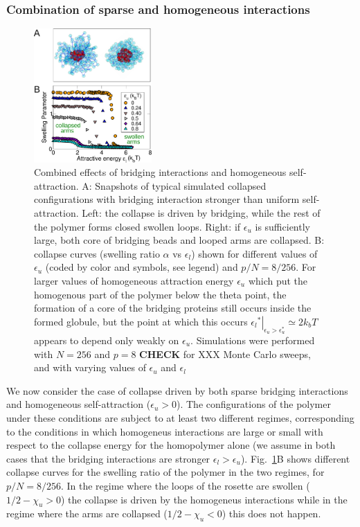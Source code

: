 \documentclass[
preprint,
a4paper,
12pt,
superscriptaddress,
pre]{revtex4}
\begin{document}
\subsubsection*{Combination of sparse and homogeneous interactions} 

\begin{figure}
  \centering
  \includegraphics[width=0.4\textwidth]{fig4}
  \caption{Combined effects of bridging interactions and
      homogeneous self-attraction.  A: Snapshots of  typical simulated
      collapsed configurations with bridging interaction stronger than
      uniform self-attraction. Left: the collapse is driven
      by bridging,  while the rest of the polymer forms closed swollen
      loops. Right: if $\epsilon_u$ is sufficiently large, both core
      of bridging beads and looped arms are collapsed. 
    B: collapse curves (swelling ratio $\alpha$ vs $\epsilon_l$) shown for
    different values of $\epsilon_u$ (coded by color and symbols, see
    legend) and $p/N = 8/256$.
%
    For larger values of homogeneous attraction energy $\epsilon_u$
    which put the homogenous part of the polymer below the theta
    point, the formation of a core  of the bridging proteins still occurs inside
    the formed globule, but the point at which this  occurs
    $\left.{\epsilon_l}^*\right|_{\epsilon_u > \epsilon_u^*} \simeq 2k_bT$
    appears to depend only weakly on $\epsilon_u$.
%
    Simulations were  performed with $N=256$ and $p=8$
    \textbf{CHECK} for XXX Monte Carlo sweeps, and with varying values
    of $\epsilon_u$ and $\epsilon_l$ }
  \label{fig:4}
\end{figure}

We now consider the case of collapse driven by both sparse bridging
interactions and homogeneous self-attraction ($\epsilon_u > 0$).  The
configurations of the polymer under these conditions are subject to at
least two different regimes, corresponding to the conditions in which
homogeneus interactions are large or small with respect to the
collapse energy for the homopolymer alone (we assume in both cases
that the bridging interactions are stronger $\epsilon_l >
\epsilon_u$).
Fig.~\ref{fig:4}B shows different collapse curves for the swelling
ratio of the polymer in the two regimes, for $p/N = 8/256$. In the
regime where the loops of the rosette are swollen ($1/2 - \chi_u > 0$)
the collapse is driven by the homogeneus interactions while in the
regime where the arms are collapsed ($1/2 - \chi_u < 0$) this does not
happen. 
%
\end{document}
